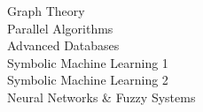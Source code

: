 
\horizontalLineLeft

Graph Theory \\
Parallel Algorithms \\
Advanced Databases \\
Symbolic Machine Learning 1 \\
Symbolic Machine Learning 2 \\
Neural Networks \& Fuzzy Systems
\sectionsep